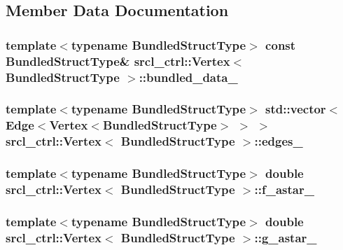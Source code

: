 \subsection{Member Data Documentation}
\hypertarget{classsrcl__ctrl_1_1Vertex_a94c4a1e06c0f4f013c01cb1bc9153b07}{
\subsubsection[{bundled\-\_\-data\-\_\-}]{\setlength{\rightskip}{0pt plus 5cm}template$<$typename Bundled\-Struct\-Type$>$ const Bundled\-Struct\-Type\& {\bf srcl\-\_\-ctrl\-::\-Vertex}$<$ Bundled\-Struct\-Type $>$\-::bundled\-\_\-data\-\_\-}}\label{classsrcl__ctrl_1_1Vertex_a94c4a1e06c0f4f013c01cb1bc9153b07}
\hypertarget{classsrcl__ctrl_1_1Vertex_a932e06c0aecac6ab2cee0f428046fedd}{
\subsubsection[{edges\-\_\-}]{\setlength{\rightskip}{0pt plus 5cm}template$<$typename Bundled\-Struct\-Type$>$ std\-::vector$<${\bf Edge}$<${\bf Vertex}$<$Bundled\-Struct\-Type$>$ $>$ $>$ {\bf srcl\-\_\-ctrl\-::\-Vertex}$<$ Bundled\-Struct\-Type $>$\-::edges\-\_\-}}\label{classsrcl__ctrl_1_1Vertex_a932e06c0aecac6ab2cee0f428046fedd}
\hypertarget{classsrcl__ctrl_1_1Vertex_ac43b465da0d5ecafce11cff22b1b5633}{
\subsubsection[{f\-\_\-astar\-\_\-}]{\setlength{\rightskip}{0pt plus 5cm}template$<$typename Bundled\-Struct\-Type$>$ double {\bf srcl\-\_\-ctrl\-::\-Vertex}$<$ Bundled\-Struct\-Type $>$\-::f\-\_\-astar\-\_\-\hspace{0.3cm}{\ttfamily [private]}}}\label{classsrcl__ctrl_1_1Vertex_ac43b465da0d5ecafce11cff22b1b5633}
\hypertarget{classsrcl__ctrl_1_1Vertex_a85d7b5498874822960ab30d6d3df3c60}{
\subsubsection[{g\-\_\-astar\-\_\-}]{\setlength{\rightskip}{0pt plus 5cm}template$<$typename Bundled\-Struct\-Type$>$ double {\bf srcl\-\_\-ctrl\-::\-Vertex}$<$ Bundled\-Struct\-Type $>$\-::g\-\_\-astar\-\_\-\hspace{0.3cm}{\ttfamily [private]}}}\label{classsrcl__ctrl_1_1Vertex_a85d7b5498874822960ab30d6d3df3c60}
